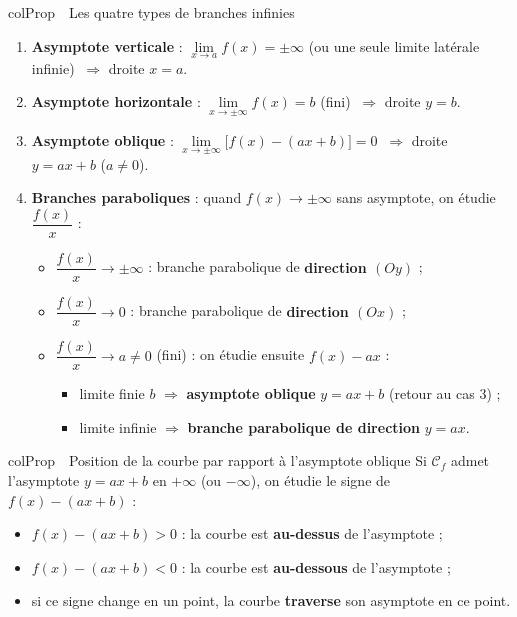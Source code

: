 \documentclass[11pt,a4paper]{article}
\newenvironment{propriete}[1][Propriété]
  {\begin{fiche}{colProp}{\ding{72}~~#1}}{\end{fiche}}
\begin{document}
\begin{propriete}[Les quatre types de branches infinies]
\begin{enumerate}[leftmargin=7mm, itemsep=0.5mm]
  \item \textbf{Asymptote verticale} : $\lim\limits_{x \to a} f(x) = \pm\infty$ (ou une seule limite latérale infinie) $\ \Rightarrow$ droite $x = a$.
  \item \textbf{Asymptote horizontale} : $\lim\limits_{x \to \pm\infty} f(x) = b$ (fini) $\ \Rightarrow$ droite $y = b$.
  \item \textbf{Asymptote oblique} : $\lim\limits_{x \to \pm\infty} \bigl[f(x) - (ax + b)\bigr] = 0$ $\ \Rightarrow$ droite $y = ax + b$ ($a \neq 0$).
  \item \textbf{Branches paraboliques} : quand $f(x) \to \pm\infty$ sans asymptote, on étudie $\dfrac{f(x)}{x}$ :
    \begin{itemize}[leftmargin=5mm]
      \item $\dfrac{f(x)}{x} \to \pm\infty$ : branche parabolique de \textbf{direction $(Oy)$} ;
      \item $\dfrac{f(x)}{x} \to 0$ : branche parabolique de \textbf{direction $(Ox)$} ;
      \item $\dfrac{f(x)}{x} \to a \neq 0$ (fini) : on étudie ensuite $f(x) - ax$ :
        \begin{itemize}[leftmargin=5mm]
          \item limite finie $b$ $\Rightarrow$ \textbf{asymptote oblique} $y = ax + b$ (retour au cas 3) ;
          \item limite infinie $\Rightarrow$ \textbf{branche parabolique de direction} $y = ax$.
        \end{itemize}
    \end{itemize}
\end{enumerate}
\end{propriete}

\begin{propriete}[Position de la courbe par rapport à l'asymptote oblique]
Si $\mathcal{C}_f$ admet l'asymptote $y = ax + b$ en $+\infty$ (ou $-\infty$), on étudie le signe de $f(x) - (ax + b)$ :
\begin{itemize}[leftmargin=6mm, itemsep=0.5mm]
  \item $f(x) - (ax+b) > 0$ : la courbe est \textbf{au-dessus} de l'asymptote ;
  \item $f(x) - (ax+b) < 0$ : la courbe est \textbf{au-dessous} de l'asymptote ;
  \item si ce signe change en un point, la courbe \textbf{traverse} son asymptote en ce point.
\end{itemize}
\end{propriete}
\end{document}
